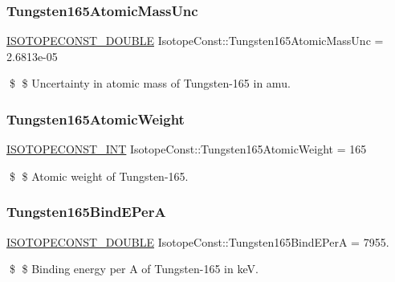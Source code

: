 \subsubsection{\texorpdfstring{Tungsten165\+Atomic\+Mass\+Unc}{Tungsten165AtomicMassUnc}}
{\footnotesize\ttfamily \mbox{\hyperlink{group___isotope_const-_macros_ga8f45a7272ce02c0b4c65c44636ed719a}{I\+S\+O\+T\+O\+P\+E\+C\+O\+N\+S\+T\+\_\+\+D\+O\+U\+B\+LE}} Isotope\+Const\+::\+Tungsten165\+Atomic\+Mass\+Unc = 2.\+6813e-\/05}

\$ \$ Uncertainty in atomic mass of Tungsten-\/165 in amu. \mbox{\label{group___isotope_const-_tungsten-_w165_gaa18c85ae4e6484347c0b05c72405b7a4}} 
\subsubsection{\texorpdfstring{Tungsten165\+Atomic\+Weight}{Tungsten165AtomicWeight}}
{\footnotesize\ttfamily \mbox{\hyperlink{group___isotope_const-_macros_ga5f18360b3e99483a35c32d789e62621c}{I\+S\+O\+T\+O\+P\+E\+C\+O\+N\+S\+T\+\_\+\+I\+NT}} Isotope\+Const\+::\+Tungsten165\+Atomic\+Weight = 165}

\$ \$ Atomic weight of Tungsten-\/165. \mbox{\label{group___isotope_const-_tungsten-_w165_ga1d5a8d93458a8e79d2a82bfa3738d815}} 
\subsubsection{\texorpdfstring{Tungsten165\+Bind\+E\+PerA}{Tungsten165BindEPerA}}
{\footnotesize\ttfamily \mbox{\hyperlink{group___isotope_const-_macros_ga8f45a7272ce02c0b4c65c44636ed719a}{I\+S\+O\+T\+O\+P\+E\+C\+O\+N\+S\+T\+\_\+\+D\+O\+U\+B\+LE}} Isotope\+Const\+::\+Tungsten165\+Bind\+E\+PerA = 7955.}

\$ \$ Binding energy per A of Tungsten-\/165 in keV. \mbox{\label{group___isotope_const-_tungsten-_w165_ga42d1725270a9efa361c7221ccda77cca}} 
